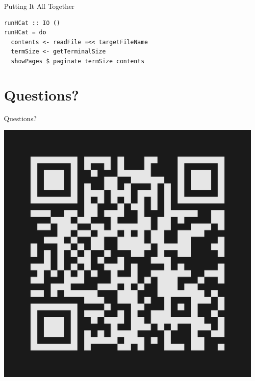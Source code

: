 \documentclass[10pt, presentation, colorlinks]{beamer}
\begin{document}
\begin{frame}[label={sec:orgaf2d13e},fragile]{Putting It All Together}
 \begin{verbatim}
runHCat :: IO ()
runHCat = do
  contents <- readFile =<< targetFileName
  termSize <- getTerminalSize
  showPages $ paginate termSize contents
\end{verbatim}
\end{frame}

\section{Questions?}
\label{sec:orga59dd9d}

\begin{frame}[label={sec:orgbf44f37}]{Questions?}

\bigskip
\begin{center}
\includegraphics[height=0.5\textheight]{./img/typeform-url.png}
\end{center}
\end{frame}
\end{document}
